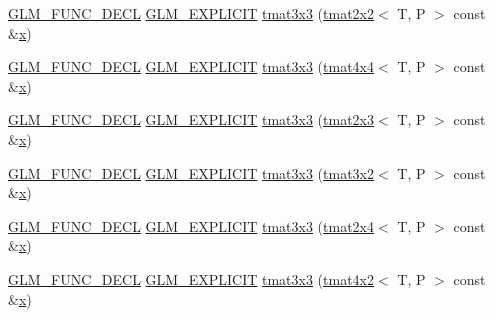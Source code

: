 \begin{DoxyCompactItemize}
\item 
\mbox{\hyperlink{setup_8hpp_ab2d052de21a70539923e9bcbf6e83a51}{G\+L\+M\+\_\+\+F\+U\+N\+C\+\_\+\+D\+E\+CL}} \mbox{\hyperlink{setup_8hpp_a6c74f5a5e7b134ab69023ff9a30d4d5d}{G\+L\+M\+\_\+\+E\+X\+P\+L\+I\+C\+IT}} \mbox{\hyperlink{structglm_1_1tmat3x3_ae07ead4a125f21a8be9c423c09434f93}{tmat3x3}} (\mbox{\hyperlink{structglm_1_1tmat2x2}{tmat2x2}}$<$ T, P $>$ const \&\mbox{\hyperlink{glad_8h_a92d0386e5c19fb81ea88c9f99644ab1d}{x}})
\item 
\mbox{\hyperlink{setup_8hpp_ab2d052de21a70539923e9bcbf6e83a51}{G\+L\+M\+\_\+\+F\+U\+N\+C\+\_\+\+D\+E\+CL}} \mbox{\hyperlink{setup_8hpp_a6c74f5a5e7b134ab69023ff9a30d4d5d}{G\+L\+M\+\_\+\+E\+X\+P\+L\+I\+C\+IT}} \mbox{\hyperlink{structglm_1_1tmat3x3_a802f89baac6ac79fe657088c95308c7b}{tmat3x3}} (\mbox{\hyperlink{structglm_1_1tmat4x4}{tmat4x4}}$<$ T, P $>$ const \&\mbox{\hyperlink{glad_8h_a92d0386e5c19fb81ea88c9f99644ab1d}{x}})
\item 
\mbox{\hyperlink{setup_8hpp_ab2d052de21a70539923e9bcbf6e83a51}{G\+L\+M\+\_\+\+F\+U\+N\+C\+\_\+\+D\+E\+CL}} \mbox{\hyperlink{setup_8hpp_a6c74f5a5e7b134ab69023ff9a30d4d5d}{G\+L\+M\+\_\+\+E\+X\+P\+L\+I\+C\+IT}} \mbox{\hyperlink{structglm_1_1tmat3x3_aedf6749905c8adde35f51c14c50197db}{tmat3x3}} (\mbox{\hyperlink{structglm_1_1tmat2x3}{tmat2x3}}$<$ T, P $>$ const \&\mbox{\hyperlink{glad_8h_a92d0386e5c19fb81ea88c9f99644ab1d}{x}})
\item 
\mbox{\hyperlink{setup_8hpp_ab2d052de21a70539923e9bcbf6e83a51}{G\+L\+M\+\_\+\+F\+U\+N\+C\+\_\+\+D\+E\+CL}} \mbox{\hyperlink{setup_8hpp_a6c74f5a5e7b134ab69023ff9a30d4d5d}{G\+L\+M\+\_\+\+E\+X\+P\+L\+I\+C\+IT}} \mbox{\hyperlink{structglm_1_1tmat3x3_a69d122cdc832030b626f7a34524216b0}{tmat3x3}} (\mbox{\hyperlink{structglm_1_1tmat3x2}{tmat3x2}}$<$ T, P $>$ const \&\mbox{\hyperlink{glad_8h_a92d0386e5c19fb81ea88c9f99644ab1d}{x}})
\item 
\mbox{\hyperlink{setup_8hpp_ab2d052de21a70539923e9bcbf6e83a51}{G\+L\+M\+\_\+\+F\+U\+N\+C\+\_\+\+D\+E\+CL}} \mbox{\hyperlink{setup_8hpp_a6c74f5a5e7b134ab69023ff9a30d4d5d}{G\+L\+M\+\_\+\+E\+X\+P\+L\+I\+C\+IT}} \mbox{\hyperlink{structglm_1_1tmat3x3_a945eb750045d533d8d9a56eb76011cfe}{tmat3x3}} (\mbox{\hyperlink{structglm_1_1tmat2x4}{tmat2x4}}$<$ T, P $>$ const \&\mbox{\hyperlink{glad_8h_a92d0386e5c19fb81ea88c9f99644ab1d}{x}})
\item 
\mbox{\hyperlink{setup_8hpp_ab2d052de21a70539923e9bcbf6e83a51}{G\+L\+M\+\_\+\+F\+U\+N\+C\+\_\+\+D\+E\+CL}} \mbox{\hyperlink{setup_8hpp_a6c74f5a5e7b134ab69023ff9a30d4d5d}{G\+L\+M\+\_\+\+E\+X\+P\+L\+I\+C\+IT}} \mbox{\hyperlink{structglm_1_1tmat3x3_ae8cd7af88bb36bd318cf96f86bc27725}{tmat3x3}} (\mbox{\hyperlink{structglm_1_1tmat4x2}{tmat4x2}}$<$ T, P $>$ const \&\mbox{\hyperlink{glad_8h_a92d0386e5c19fb81ea88c9f99644ab1d}{x}})

\end{DoxyCompactItemize}

